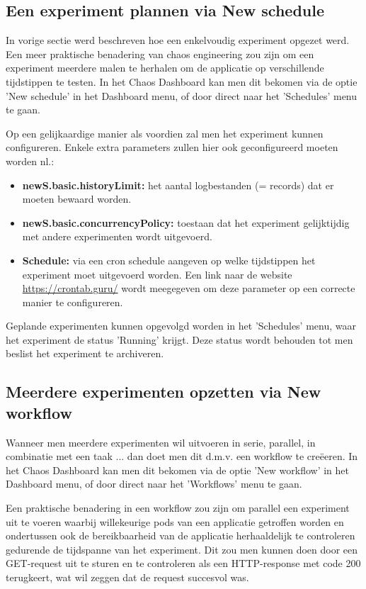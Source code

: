 \subsection{Een experiment plannen via New schedule}

In vorige sectie werd beschreven hoe een enkelvoudig experiment opgezet werd. Een meer praktische benadering van chaos engineering zou zijn om een experiment meerdere malen te herhalen om de applicatie op verschillende tijdstippen te testen. In het Chaos Dashboard kan men dit bekomen via de optie 'New schedule' in het Dashboard menu, of door direct naar het 'Schedules' menu te gaan. 

Op een gelijkaardige manier als voordien zal men het experiment kunnen configureren. Enkele extra parameters zullen hier ook geconfigureerd moeten worden nl.:
\begin{itemize}
    \item {\bf newS.basic.historyLimit:} het aantal logbestanden (= records) dat er moeten bewaard worden.
    \item {\bf newS.basic.concurrencyPolicy:} toestaan dat het experiment gelijktijdig met andere experimenten wordt uitgevoerd.
    \item {\bf Schedule:} via een cron schedule aangeven op welke tijdstippen het experiment moet uitgevoerd worden. Een link naar de website \url{https://crontab.guru/} wordt meegegeven om deze parameter op een correcte manier te configureren.
\end{itemize}

Geplande experimenten kunnen opgevolgd worden in het 'Schedules' menu, waar het experiment de status 'Running' krijgt. Deze status wordt behouden tot men beslist het experiment te archiveren. 

\subsection{Meerdere experimenten opzetten via New workflow}

Wanneer men meerdere experimenten wil uitvoeren in serie, parallel, in combinatie met een taak ... dan doet men dit d.m.v. een workflow te creëeren. In het Chaos Dashboard kan men dit bekomen via de optie 'New workflow' in het Dashboard menu, of door direct naar het 'Workflows' menu te gaan.

Een praktische benadering in een workflow zou zijn om parallel een experiment uit te voeren waarbij  willekeurige pods van een applicatie getroffen worden en ondertussen ook de bereikbaarheid van de applicatie herhaaldelijk te controleren gedurende de tijdspanne van het experiment. Dit zou men kunnen doen door een GET-request uit te sturen en te controleren als een HTTP-response met code 200 terugkeert, wat wil zeggen dat de request succesvol was. \autocite{MDN2022} 

